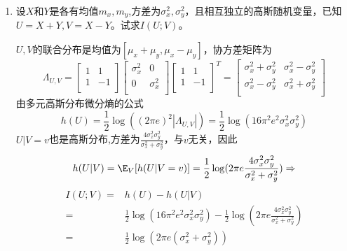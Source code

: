 \documentclass[a4paper]{article}
\begin{document}
\courseheader
{}

\begin{enumerate}
  \setlength{\itemsep}{3\parskip}

  \item 设$X$和$Y$是各有均值$m_x,m_y$,方差为$\sigma_x^2,\sigma_y^2$，且相互独立的高斯随机变量，已知$U=X+Y,V=X-Y$。试求$I(U;V)$。
\begin{solution}
$U,V$的联合分布是均值为$[\mu_x+\mu_y,\mu_x-\mu_y]$，协方差矩阵为
$$\Lambda_{U,V}=\begin{bmatrix}
1 & 1\\
1 & -1\\
\end{bmatrix}
\begin{bmatrix}
\sigma_x^2 & 0\\
0 & \sigma_x^2\\
\end{bmatrix}
\begin{bmatrix}
1 & 1\\
1 & -1\\
\end{bmatrix}^T
=\begin{bmatrix}
\sigma_x^2+\sigma_y^2 & \sigma_x^2-\sigma_y^2\\
\sigma_x^2-\sigma_y^2 & \sigma_x^2+\sigma_y^2\\
\end{bmatrix}
$$
由多元高斯分布微分熵的公式
$$
h(U)=\frac{1}{2}\log ((2\pi e)^2 |\Lambda_{U,V}|)=\frac{1}{2}\log(16\pi^2 e^2 \sigma^2_x\sigma^2_y)
$$
$U|V=v$也是高斯分布,方差为$\frac{4\sigma_x^2\sigma_y^2}{\sigma_x^2+\sigma_y^2}$，与$v$无关，因此
$$
h(U|V)=\E_{V}[h(U|V=v)]=\frac{1}{2}\log(2\pi e \frac{4\sigma_x^2\sigma_y^2}{\sigma_x^2+\sigma_y^2})\Rightarrow
$$
\begin{align*}
I(U;V)=& h(U)-h(U|V)\\
=&\frac{1}{2}\log(16\pi^2 e^2 \sigma^2_x\sigma^
2_y)-\frac{1}{2}\log(2\pi e \frac{4\sigma_x^2\sigma_y^2}{\sigma_x^2+\sigma_y^2})\\
=&\frac{1}{2}\log(2\pi e (\sigma_x^2+\sigma_y^2))
\end{align*}



\end{solution}
\end{enumerate}
\end{document}
